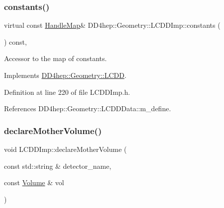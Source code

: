 \hypertarget{class_d_d4hep_1_1_geometry_1_1_l_c_d_d_imp_a4c8db4aeaa5270cdfb467a4ff123edc6}{}\label{class_d_d4hep_1_1_geometry_1_1_l_c_d_d_imp_a4c8db4aeaa5270cdfb467a4ff123edc6} 
\subsubsection{\texorpdfstring{constants()}{constants()}}
{\footnotesize\ttfamily virtual const \hyperlink{class_d_d4hep_1_1_geometry_1_1_l_c_d_d_a05cb11e7355772c7b0794bcca59bf477}{Handle\+Map}\& D\+D4hep\+::\+Geometry\+::\+L\+C\+D\+D\+Imp\+::constants (\begin{DoxyParamCaption}{ }\end{DoxyParamCaption}) const\hspace{0.3cm}{\ttfamily [inline]}, {\ttfamily [virtual]}}



Accessor to the map of constants. 



Implements \hyperlink{class_d_d4hep_1_1_geometry_1_1_l_c_d_d_a14d6ac1a5de3cd514372ab8717b6420e}{D\+D4hep\+::\+Geometry\+::\+L\+C\+DD}.



Definition at line 220 of file L\+C\+D\+D\+Imp.\+h.



References D\+D4hep\+::\+Geometry\+::\+L\+C\+D\+D\+Data\+::m\+\_\+define.

\hypertarget{class_d_d4hep_1_1_geometry_1_1_l_c_d_d_imp_ac8faeaaa5f56b48c6306cb3099f84568}{}\label{class_d_d4hep_1_1_geometry_1_1_l_c_d_d_imp_ac8faeaaa5f56b48c6306cb3099f84568} 
\subsubsection{\texorpdfstring{declare\+Mother\+Volume()}{declareMotherVolume()}}
{\footnotesize\ttfamily void L\+C\+D\+D\+Imp\+::declare\+Mother\+Volume (\begin{DoxyParamCaption}\item[{const std\+::string \&}]{detector\+\_\+name,  }\item[{const \hyperlink{class_d_d4hep_1_1_geometry_1_1_volume}{Volume} \&}]{vol }\end{DoxyParamCaption})\hspace{0.3cm}{\ttfamily [virtual]}}




